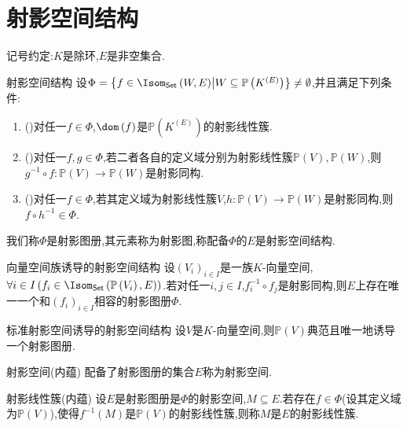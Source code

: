 \section{射影空间结构}

记号约定:$K$是除环,$E$是非空集合.

\begin{definition}{射影空间结构}{}
	设$\Phi=\left\{f\in\Isom_{\mathsf{Set}}\left(W,E\right)\middle|W\subseteq\mathbb{P}\left(K^{\left(E\right)}\right)\right\}\neq\emptyset$,并且满足下列条件:
	\begin{enumerate}
		\item ()对任一$f\in\Phi$,$\dom\left(f\right)$是$\mathbb{P}\left(K^{\left(E\right)}\right)$的射影线性簇.
		\item ()对任一$f,g\in\Phi$,若二者各自的定义域分别为射影线性簇$\mathbb{P}\left(V\right),\mathbb{P}\left(W\right)$,则$g^{-1}\circ f:\mathbb{P}\left(V\right)\to\mathbb{P}\left(W\right)$是射影同构.
		\item ()对任一$f\in\Phi$,若其定义域为射影线性簇$V$,$h:\mathbb{P}\left(V\right)\to\mathbb{P}\left(W\right)$是射影同构,则$f\circ h^{-1}\in\Phi$.
	\end{enumerate}
	我们称$\Phi$是射影图册,其元素称为射影图,称配备$\Phi$的$E$是射影空间结构.
\end{definition}

\begin{theorem}{向量空间族诱导的射影空间结构}{}
	设$\left(V_{i}\right)_{i\in I}$是一族$K$-向量空间,$\forall i\in I\left(f_{i}\in\Isom_{\mathsf{Set}}\left(\mathbb{P}\left(V_{i}\right),E\right)\right)$.若对任一$i,j\in I$,$f_{i}^{-1}\circ f_{j}$是射影同构,则$E$上存在唯一一个和$\left(f_{i}\right)_{i\in I}$相容的射影图册$\Phi$.
\end{theorem}

\begin{corollary}{标准射影空间诱导的射影空间结构}{}
	设$V$是$K$-向量空间,则$\mathbb{P}\left(V\right)$典范且唯一地诱导一个射影图册.
\end{corollary}

\begin{definition}{射影空间(内蕴)}{}
	配备了射影图册的集合$E$称为射影空间.
\end{definition}

\begin{definition}{射影线性簇(内蕴)}{}
	设$E$是射影图册是$\Phi$的射影空间,$M\subseteq E$.若存在$f\in\Phi$(设其定义域为$\mathbb{P}\left(V\right)$),使得$f^{-1}\left(M\right)$是$\mathbb{P}\left(V\right)$的射影线性簇,则称$M$是$E$的射影线性簇.
\end{definition}

